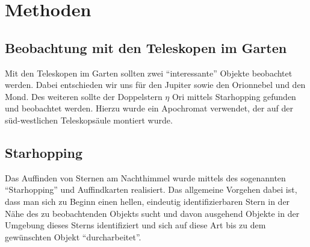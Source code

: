 \section{Methoden}
\subsection{Beobachtung mit den Teleskopen im Garten}
Mit den Teleskopen im Garten sollten zwei \enquote{interessante} Objekte beobachtet werden. Dabei entschieden wir uns für den Jupiter sowie den Orionnebel und den Mond. Des weiteren sollte der Doppelstern $\eta$ Ori mittels Starhopping gefunden und beobachtet werden. Hierzu wurde ein Apochromat verwendet, der auf der süd-westlichen Teleskopsäule montiert wurde. 
\subsection{Starhopping}
Das Auffinden von Sternen am Nachthimmel wurde mittels des sogenannten \enquote{Starhopping} und Auffindkarten realisiert. Das allgemeine Vorgehen dabei ist, dass man sich zu Beginn einen hellen, eindeutig identifizierbaren Stern in der Nähe des zu beobachtenden Objekts sucht und davon ausgehend Objekte in der Umgebung dieses Sterns identifiziert und sich auf diese Art bis zu dem gewünschten Objekt \enquote{durcharbeitet}.  

